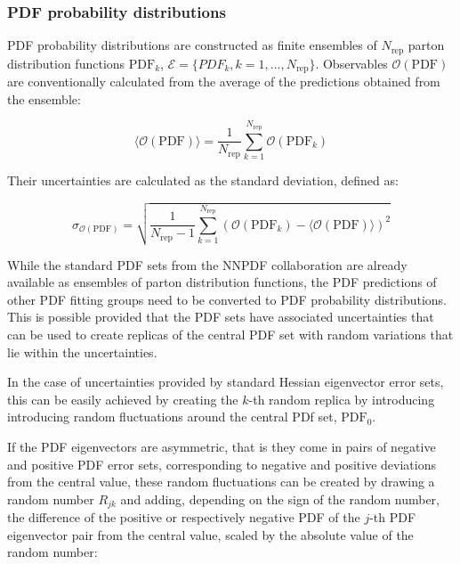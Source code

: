 \subsubsection{PDF probability distributions}

PDF probability distributions are constructed as finite ensembles of $N_{\mathrm{rep}}$ parton distribution functions $\mathrm{PDF}_k$, $\mathcal{E} = \{PDF_k, k = 1, . . . ,N_{\mathrm{rep}}\}$. Observables $\mathcal{O}(\mathrm{PDF})$ are conventionally calculated from the average of the predictions obtained from the ensemble:

\begin{equation}
 \langle\mathcal{O}(\mathrm{PDF})\rangle = \frac{1}{N_{\mathrm{rep}}} \sum_{k=1}^{N_{\mathrm{rep}}} \mathcal{O}(\mathrm{PDF}_k)
\label{eq:meanReplicas}
\end{equation}
 
Their uncertainties are calculated as the standard deviation, defined as:

\begin{equation}
\sigma_{\mathcal{O}(\mathrm{PDF})} = \sqrt{  \frac{1}{N_{\mathrm{rep}} - 1 }  \sum_{k=1}^{N_{\mathrm{rep}}} 
( \mathcal{O}(\mathrm{PDF}_k) - \langle \mathcal{O}(\mathrm{PDF})  \rangle   )^2     
     }
\end{equation}

While the standard PDF sets from the NNPDF collaboration are already available as ensembles of parton distribution functions, the PDF predictions of other PDF fitting groups need to be converted to PDF probability distributions. This is possible provided that the PDF sets have associated uncertainties that can be used to create replicas of the central PDF set with random variations that lie within the uncertainties. 

In the case of uncertainties provided by standard Hessian eigenvector error sets, this can be easily achieved 
by creating the $k$-th random replica by introducing introducing random fluctuations around the central PDf set, $\mathrm{PDF}_0$.

If the PDF eigenvectors are asymmetric, that is they come in pairs of negative and positive PDF error sets, 
corresponding to negative and positive deviations from the central value, these random fluctuations can be created by 
drawing a random number $R_{jk}$ and adding, depending on the sign of the random number, 
the difference of the positive or respectively negative PDF of the $j$-th PDF eigenvector pair from the central value, 
scaled by the absolute value of the random number:


